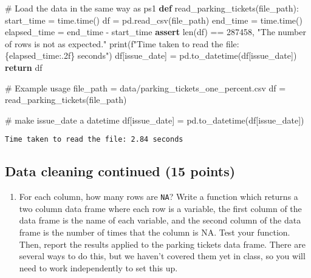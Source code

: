 \documentclass[
  letterpaper,
  DIV=11,
  numbers=noendperiod]{scrartcl}
\newenvironment{Shaded}{\begin{snugshade}}{\end{snugshade}}
\newcommand{\BuiltInTok}[1]{\textcolor[rgb]{0.00,0.23,0.31}{#1}}
\newcommand{\CommentTok}[1]{\textcolor[rgb]{0.37,0.37,0.37}{#1}}
\newcommand{\ControlFlowTok}[1]{\textcolor[rgb]{0.00,0.23,0.31}{\textbf{#1}}}
\newcommand{\DecValTok}[1]{\textcolor[rgb]{0.68,0.00,0.00}{#1}}
\newcommand{\KeywordTok}[1]{\textcolor[rgb]{0.00,0.23,0.31}{\textbf{#1}}}
\newcommand{\NormalTok}[1]{\textcolor[rgb]{0.00,0.23,0.31}{#1}}
\newcommand{\OperatorTok}[1]{\textcolor[rgb]{0.37,0.37,0.37}{#1}}
\newcommand{\SpecialCharTok}[1]{\textcolor[rgb]{0.37,0.37,0.37}{#1}}
\newcommand{\SpecialStringTok}[1]{\textcolor[rgb]{0.13,0.47,0.30}{#1}}
\newcommand{\StringTok}[1]{\textcolor[rgb]{0.13,0.47,0.30}{#1}}
\providecommand{\tightlist}{%
  \setlength{\itemsep}{0pt}\setlength{\parskip}{0pt}}\usepackage{longtable,booktabs,array}
\begin{document}
\begin{Shaded}
\begin{Highlighting}[]
\CommentTok{\# Load the data in the same way as ps1}
\KeywordTok{def}\NormalTok{ read\_parking\_tickets(file\_path):}
\NormalTok{    start\_time }\OperatorTok{=}\NormalTok{ time.time()}
\NormalTok{    df }\OperatorTok{=}\NormalTok{ pd.read\_csv(file\_path)}
\NormalTok{    end\_time }\OperatorTok{=}\NormalTok{ time.time()}
\NormalTok{    elapsed\_time }\OperatorTok{=}\NormalTok{ end\_time }\OperatorTok{{-}}\NormalTok{ start\_time}
    \ControlFlowTok{assert} \BuiltInTok{len}\NormalTok{(df) }\OperatorTok{==} \DecValTok{287458}\NormalTok{, }\StringTok{"The number of rows is not as expected."}
    \BuiltInTok{print}\NormalTok{(}\SpecialStringTok{f"Time taken to read the file: }\SpecialCharTok{\{}\NormalTok{elapsed\_time}\SpecialCharTok{:.2f\}}\SpecialStringTok{ seconds"}\NormalTok{)}
\NormalTok{    df[}\StringTok{\textquotesingle{}issue\_date\textquotesingle{}}\NormalTok{] }\OperatorTok{=}\NormalTok{ pd.to\_datetime(df[}\StringTok{\textquotesingle{}issue\_date\textquotesingle{}}\NormalTok{])}
    \ControlFlowTok{return}\NormalTok{ df}

\CommentTok{\# Example usage}
\NormalTok{file\_path }\OperatorTok{=} \StringTok{\textquotesingle{}data/parking\_tickets\_one\_percent.csv\textquotesingle{}}
\NormalTok{df }\OperatorTok{=}\NormalTok{ read\_parking\_tickets(file\_path)}

\CommentTok{\# make issue\_date a datetime}
\NormalTok{df[}\StringTok{\textquotesingle{}issue\_date\textquotesingle{}}\NormalTok{] }\OperatorTok{=}\NormalTok{ pd.to\_datetime(df[}\StringTok{\textquotesingle{}issue\_date\textquotesingle{}}\NormalTok{])}
\end{Highlighting}
\end{Shaded}

\begin{verbatim}
Time taken to read the file: 2.84 seconds
\end{verbatim}

\subsection{Data cleaning continued (15
points)}\label{data-cleaning-continued-15-points}

\begin{enumerate}
\def\labelenumi{\arabic{enumi}.}
\tightlist
\item
  For each column, how many rows are \texttt{NA}? Write a function which
  returns a two column data frame where each row is a variable, the
  first column of the data frame is the name of each variable, and the
  second column of the data frame is the number of times that the column
  is NA. Test your function. Then, report the results applied to the
  parking tickets data frame. There are several ways to do this, but we
  haven't covered them yet in class, so you will need to work
  independently to set this up.
\end{enumerate}
\end{document}
